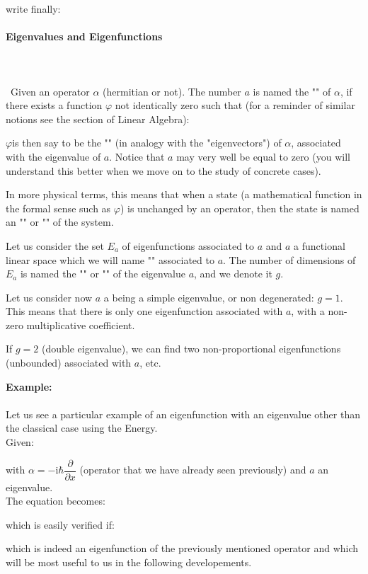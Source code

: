 	write finally:
	
	
	\paragraph{Eigenvalues and Eigenfunctions}\mbox{}\\\\\
	Given an operator $\alpha$ (hermitian or not). The number $a$ is named the "" of $\alpha$, if there exists a function $\varphi$ not identically zero such that (for a reminder of similar notions see the section of Linear Algebra):

$\varphi $is then say to be the "" (in analogy with the "eigenvectors") of $\alpha$, associated with the eigenvalue of $a$. Notice that $a$ may very well be equal to zero (you will understand this better when we move on to the study of concrete cases).
	
	In more physical terms, this means that when a state (a mathematical function in the formal sense such as $\varphi$) is unchanged by an operator, then the state is named an "" or "" of the system.

	Let us consider the set $E_a$ of eigenfunctions associated to $a$ and $a$ a functional linear space which we will name "" associated to $a$. The number of dimensions of $E_a$ is named the "" or "" of the eigenvalue $a$, and we denote it $g$.

	Let us consider now $a$ a being a simple eigenvalue, or non degenerated: $g=1$. This means that there is only one eigenfunction associated with $a$, with a non-zero multiplicative coefficient.

	If $g=2$ (double eigenvalue), we can find two non-proportional eigenfunctions (unbounded) associated with $a$, etc.
	
	\begin{tcolorbox}[colframe=black,colback=white,sharp corners]
	\textbf{{\Large {}}Example:}\\\\
	Let us see a particular example of an eigenfunction with an eigenvalue other than the classical case using the Energy.\\
	
	Given:
	
	with $\alpha=-\mathrm{i}\hbar\dfrac{\partial}{\partial x}$ (operator that we have already seen previously) and $a$ an eigenvalue.\\

	The equation becomes:
	
	which is easily verified if:
	
	which is indeed an eigenfunction of the previously mentioned operator and which will be most useful to us in the following developements.
	\end{tcolorbox}
	

